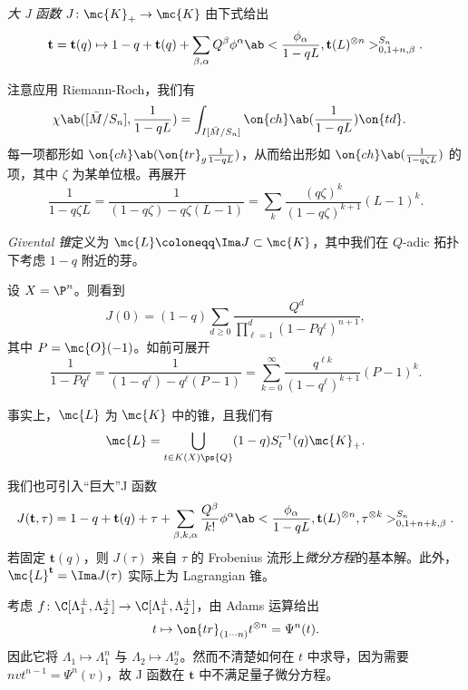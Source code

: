 \begin{defn}
    \textit{大 J 函数} \(J \colon \mc{K}_+ \to \mc{K}\) 由下式给出
    \[ \mathbf{t} = \mathbf{t}(q) \mapsto 1 - q + \mathbf{t}(q) + \sum_{\beta, \alpha} Q^{\beta} \phi^{\alpha} \ab< \frac{\phi_{\alpha}}{1-qL}, \mathbf{t}(L)^{\otimes n}>_{0, 1+n, \beta}^{S_n}. \]
\end{defn}

\begin{rmk}
    注意应用 Riemann-Roch，我们有
    \begin{align*}
        \chi\ab([\bar{M}/S_n], \frac{1}{1-qL}) &= \int_{I[\bar{M}/S_n]} \on{ch}\ab(\frac{1}{1-qL}) \on{td}.
    \end{align*}
    每一项都形如 \(\on{ch}\ab(\on{tr}_g \frac{1}{1-qL})\)，从而给出形如 \(\on{ch}\ab(\frac{1}{1-q\zeta L})\) 的项，其中 \(\zeta\) 为某单位根。再展开
    \[ \frac{1}{1-q\zeta L} = \frac{1}{(1-q \zeta) - q\zeta (L-1)} = \sum_k \frac{(q\zeta)^k}{(1-q\zeta)^{k+1}}(L-1)^k. \]
\end{rmk}

\begin{defn}
    \textit{Givental 锥}定义为 \(\mc{L} \coloneqq \Ima J \subset \mc{K}\)，其中我们在 \(Q\)-adic 拓扑下考虑 \(1-q\) 附近的芽。
\end{defn}

\begin{exm}
    设 \(X = \P^n\)。则看到
    \[ J(0) = (1-q) \sum_{d \geq 0} \frac{Q^d}{\prod_{\ell=1}^d (1-Pq^{\ell})^{n+1}}, \]
    其中 \(P = \mc{O}(-1)\)。如前可展开
    \[ \frac{1}{1-P q^{\ell}} = \frac{1}{(1-q^{\ell}) - q^{\ell}(P-1)} = \sum_{k=0}^{\infty} \frac{q^{\ell k}}{(1-q^{\ell})^{k+1}}(P-1)^k. \]
\end{exm}

\begin{prop}
    事实上，\(\mc{L}\) 为 \(\mc{K}\) 中的锥，且我们有
    \[ \mc{L} = \bigcup_{t \in K(X)\ps{Q}} (1-q) S_{t}^{-1}(q) \mc{K}_+. \]
\end{prop}

我们也可引入“巨大”J 函数
\[ J(\mathbf{t}, \tau) = 1-q + \mathbf{t}(q) + \tau + \sum_{\beta, k, \alpha} \frac{Q^{\beta}}{k!} \phi^{\alpha} \ab< \frac{\phi_{\alpha}}{1-qL}, \mathbf{t}(L)^{\otimes n}, \tau^{\otimes k}>_{0,1+n+k,\beta}^{S_n}. \]
若固定 \(\mathbf{t}(q)\)，则 \(J(\tau)\) 来自 \(\tau\) 的 Frobenius 流形上\textit{微分方程}的基本解。此外，\(\mc{L}^{\mathbf{t}}=  \Ima J(\tau)\) 实际上为 Lagrangian 锥。

\begin{exm}
    考虑 \(f \colon \C[\Lambda_1^{\pm}, \Lambda_2^{\pm}] \to \C[\Lambda_1^{\pm}, \Lambda_2^{\pm}]\)，由 Adams 运算给出
    \[ t \mapsto \on{tr}_{(1\cdots n)} t^{\otimes n} = \Psi^n (t). \]
    因此它将 \(\Lambda_1 \mapsto \Lambda_1^n\) 与 \(\Lambda_2 \mapsto \Lambda_2^n\)。然而不清楚如何在 \(t\) 中求导，因为需要 \(nv t^{n-1} = \Psi^n(v)\)，故 J 函数在 \(\mathbf{t}\) 中不满足量子微分方程。
\end{exm}

